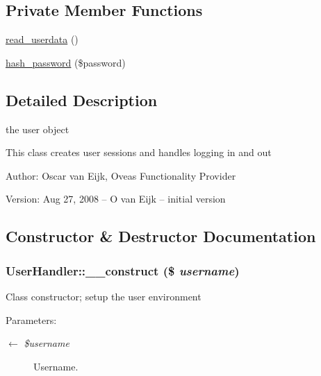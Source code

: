 \subsection*{Private Member Functions}
\begin{CompactItemize}
\item 
\hyperlink{classUserHandler_4e9fb2f7763124ea84ebaf3b744d2d88}{read\_\-userdata} ()
\item 
\hyperlink{classUserHandler_6b2bbbdb4f1a08578c219a933880a1de}{hash\_\-password} (\$password)
\end{CompactItemize}


\subsection{Detailed Description}
the user object 

This class creates user sessions and handles logging in and out \begin{Desc}
\item[Author:]Oscar van Eijk, Oveas Functionality Provider \end{Desc}
\begin{Desc}
\item[Version:]Aug 27, 2008 -- O van Eijk -- initial version \end{Desc}


\subsection{Constructor \& Destructor Documentation}
\hypertarget{classUserHandler_624054e9693139a3fe5af0ef3b757f04}{
\subsubsection{\setlength{\rightskip}{0pt plus 5cm}UserHandler::\_\-\_\-construct (\$ {\em username})}}
\label{classUserHandler_624054e9693139a3fe5af0ef3b757f04}


Class constructor; setup the user environment

\begin{Desc}
\item[Parameters:]
\begin{description}
\item[\mbox{$\leftarrow$} {\em \$username}]Username. \end{description}
\end{Desc}


